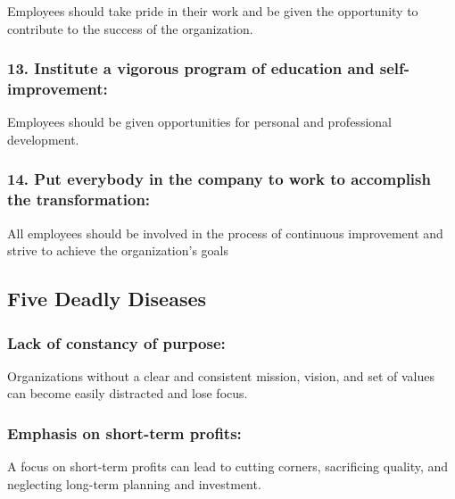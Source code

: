 \documentclass[11pt]{article}
\begin{document}
Employees should take pride in their work and be given the opportunity
to contribute to the success of the organization.

\hypertarget{institute-a-vigorous-program-of-education-and-self-improvement}{%
\subsubsection{13. Institute a vigorous program of education and
self-improvement:}\label{institute-a-vigorous-program-of-education-and-self-improvement}}

Employees should be given opportunities for personal and professional
development.

\hypertarget{put-everybody-in-the-company-to-work-to-accomplish-the-transformation}{%
\subsubsection{14. Put everybody in the company to work to accomplish
the
transformation:}\label{put-everybody-in-the-company-to-work-to-accomplish-the-transformation}}

All employees should be involved in the process of continuous
improvement and strive to achieve the organization's goals

\hypertarget{five-deadly-diseases}{%
\subsection{Five Deadly Diseases}\label{five-deadly-diseases}}

\hypertarget{lack-of-constancy-of-purpose}{%
\subsubsection{Lack of constancy of
purpose:}\label{lack-of-constancy-of-purpose}}

Organizations without a clear and consistent mission, vision, and set of
values can become easily distracted and lose focus.

\hypertarget{emphasis-on-short-term-profits}{%
\subsubsection{Emphasis on short-term
profits:}\label{emphasis-on-short-term-profits}}

A focus on short-term profits can lead to cutting corners, sacrificing
quality, and neglecting long-term planning and investment.
\end{document}
